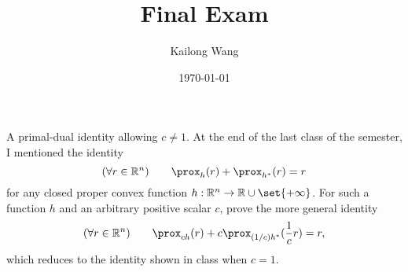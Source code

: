 \documentclass{article}
\title{Final Exam}
\author{Kailong Wang}
\date{\today}
\begin{document}
\maketitle

\begin{problem}
    {A primal-dual identity allowing $c\neq 1$.}
    At the end of the last class of the semester, I mentioned the identity
    \[(\forall r\in\R^n) \qquad \prox_h(r)+\prox_{h^*}(r)=r\]
    for any closed proper convex function $h: \R^n\rightarrow\R\cup\set{+\infty}$. For such a function $h$ and an arbitrary positive scalar $c$, prove the more general identity
    \[(\forall r\in\R^n) \qquad \prox_{ch}(r)+c\prox_{(1/c)h^*}(\frac{1}{c}r)=r,\]
    which reduces to the identity shown in class when $c=1$.
\end{problem}
\end{document}
